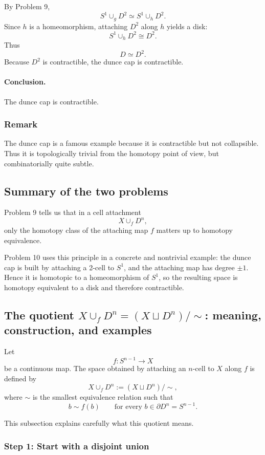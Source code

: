 \documentclass[12pt,a4paper]{article}
\theoremstyle{notespace}
\begin{document}
By Problem 9,
\[
S^1\cup_g D^2 \simeq S^1\cup_h D^2.
\]
Since \(h\) is a homeomorphism, attaching \(D^2\) along \(h\) yields a disk:
\[
S^1\cup_h D^2 \cong D^2.
\]
Thus
\[
D \simeq D^2.
\]
Because \(D^2\) is contractible, the dunce cap is contractible.

\paragraph{Conclusion.}
The dunce cap is contractible.

\subsubsection{Remark}

The dunce cap is a famous example because it is contractible but not collapsible. Thus it is topologically trivial from the homotopy point of view, but combinatorially quite subtle.

\subsection{Summary of the two problems}

Problem 9 tells us that in a cell attachment
\[
X\cup_f D^n,
\]
only the homotopy class of the attaching map \(f\) matters up to homotopy equivalence.

Problem 10 uses this principle in a concrete and nontrivial example: the dunce cap is built by attaching a 2-cell to \(S^1\), and the attaching map has degree \(\pm1\). Hence it is homotopic to a homeomorphism of \(S^1\), so the resulting space is homotopy equivalent to a disk and therefore contractible.

\subsection{The quotient \(X\cup_f D^n=(X\sqcup D^n)/\sim\): meaning, construction, and examples}

Let
\[
f:S^{n-1}\to X
\]
be a continuous map. The space obtained by attaching an \(n\)-cell to \(X\) along \(f\) is defined by
\[
X\cup_f D^n := (X\sqcup D^n)/\sim,
\]
where \(\sim\) is the smallest equivalence relation such that
\[
b\sim f(b)
\qquad
\text{for every } b\in \partial D^n=S^{n-1}.
\]

This subsection explains carefully what this quotient means.

\subsubsection{Step 1: Start with a disjoint union}
\end{document}
